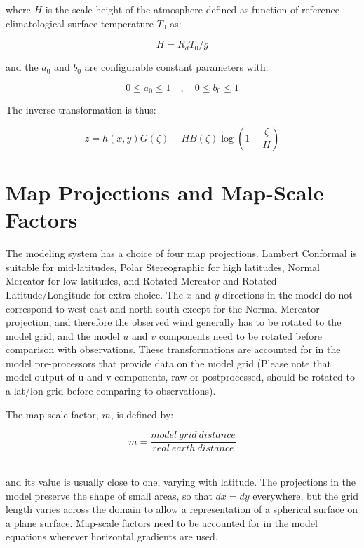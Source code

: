 where $H$ is the scale height of the atmosphere defined as function of
reference climatological surface temperature $T_0$ as:

\begin{equation}
H = R_d T_0 / g
\end{equation}

and the $a_0$ and $b_0$ are configurable constant parameters with:

\begin{equation}
0 \le a_0 \le 1 \quad , \quad 0 \le b_0 \le 1
\end{equation}

The inverse transformation is thus:

\begin{equation}
  z = h(x,y) G(\zeta) - H B(\zeta) \log\left(1-\frac{\zeta}{H}\right)
\end{equation}

\section{Map Projections and Map-Scale Factors}
The modeling system has a
choice of four map projections. Lambert Conformal is suitable for mid-latitudes,
Polar Stereographic for high latitudes, Normal Mercator for low latitudes, and
Rotated Mercator and Rotated Latitude/Longitude for extra choice.
The $x$ and $y$ directions in the model do
not correspond to west-east and north-south except for the Normal Mercator
projection, and therefore the observed wind generally has to be rotated to the
model grid, and the model $u$ and $v$ components need to be rotated before
comparison with observations. These transformations are accounted for in the
model pre-processors that provide data on the model grid (Please note that
model output of u and v components, raw or postprocessed, should be rotated to a
lat/lon grid before comparing to observations).

The map scale factor, $m$, is defined by:

\begin{equation}
  m = \frac{model\:grid\:distance}{real\:earth\:distance}
\end{equation}

\noindent \\ and its value is usually close to one, varying with latitude. The
projections in the model preserve the shape of small areas, so that $dx=dy$
everywhere, but the grid length varies across the domain to allow a
representation of a spherical surface on a plane surface.
Map-scale factors need to be accounted for in the model equations wherever
horizontal gradients are used.

